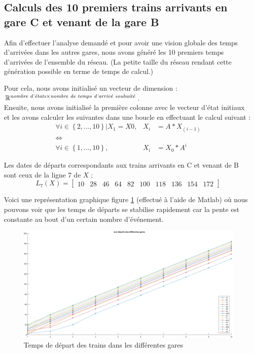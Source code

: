 \subsection{Calculs des 10 premiers trains arrivants en gare C et venant de la gare B}
Afin d'effectuer l'analyse demandé et pour avoir une vision globale des temps d'arrivées dans les autres gares, nous avons généré les 10 premiers temps d'arrivées de l'ensemble du réseau. (La petite taille du réseau rendant cette génération possible en terme de temps de calcul.)

Pour cela, nous avons initialisé un vecteur de dimension : $\mathbb{R}^{ \text{\emph{nombre d'états}} \times \text{\emph{nombre de temps d'arrivé souhaité}}}$.\\
Ensuite, nous avons initialisé la première colonne avec le vecteur d'état initiaux et les avons calculer les suivantes dans une boucle en effectuant le calcul suivant : 
\begin{eqnarray}
\forall i \in \left\lbrace 2, ..., 10\right\rbrace | X_1 = X0 ,&    X_{i}&=A*X_{(i-1)}\\
\Leftrightarrow&&\\
\forall i \in \left\lbrace 1, ..., 10\right\rbrace ,&    X_{i}&=X_0*A^i
\end{eqnarray}

Les dates de départs correspondants aux trains arrivants en C et venant de B sont ceux  de la ligne 7 de $X$ :
\begin{equation}
L_7(X)= \begin{bmatrix} 10&28&46&64&82&100&118&136&154&172 \end{bmatrix}
\end{equation}


Voici une représentation graphique figure \ref{fig:temps_arrivee} (effectué à l'aide de Matlab) où nous pouvons voir que les temps de départs se stabilise rapidement car la pente est constante au bout d'un certain nombre d'événement.
\begin{figure}[!ht]
\centering
\includegraphics[width = .7\textwidth]{./I/images/temps_departs.png}
\caption{\label{fig:temps_arrivee} Temps de départ des trains dans les différentes gares}
\end{figure}


